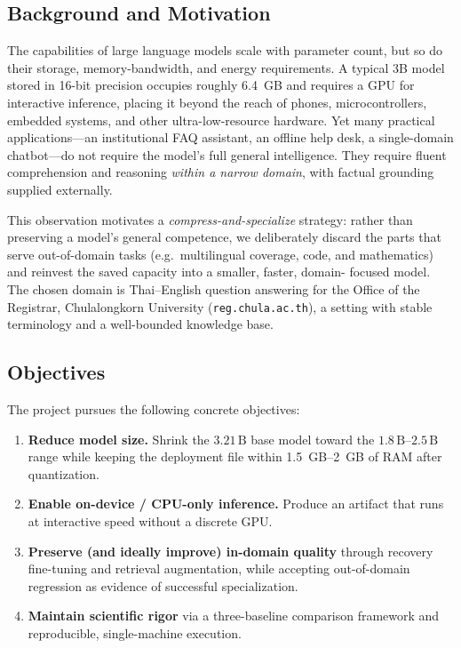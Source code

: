 \documentclass[11pt,a4paper]{article}
\newcommand{\param}[1]{\ensuremath{#1\,\text{B}}}
\begin{document}
\subsection{Background and Motivation}
The capabilities of large language models scale with parameter count, but so
do their storage, memory-bandwidth, and energy requirements. A typical 3B
model stored in 16-bit precision occupies roughly \SI{6.4}{GB} and requires a
GPU for interactive inference, placing it beyond the reach of phones,
microcontrollers, embedded systems, and other ultra-low-resource hardware.
Yet many practical applications---an institutional FAQ assistant, an offline
help desk, a single-domain chatbot---do not require the model's full general
intelligence. They require fluent comprehension and reasoning \emph{within a
narrow domain}, with factual grounding supplied externally.

This observation motivates a \emph{compress-and-specialize} strategy: rather
than preserving a model's general competence, we deliberately discard the
parts that serve out-of-domain tasks (e.g.\ multilingual coverage, code, and
mathematics) and reinvest the saved capacity into a smaller, faster, domain-%
focused model. The chosen domain is Thai--English question answering for the
Office of the Registrar, Chulalongkorn University (\texttt{reg.chula.ac.th}),
a setting with stable terminology and a well-bounded knowledge base.

\subsection{Objectives}
The project pursues the following concrete objectives:
\begin{enumerate}[label=(O\arabic*),leftmargin=2.4em]
  \item \textbf{Reduce model size.} Shrink the \param{3.21} base model toward
        the \param{1.8}--\param{2.5} range while keeping the deployment file
        within \SIrange{1.5}{2}{GB} of RAM after quantization.
  \item \textbf{Enable on-device / CPU-only inference.} Produce an artifact
        that runs at interactive speed without a discrete GPU.
  \item \textbf{Preserve (and ideally improve) in-domain quality} through
        recovery fine-tuning and retrieval augmentation, while accepting
        out-of-domain regression as evidence of successful specialization.
  \item \textbf{Maintain scientific rigor} via a three-baseline comparison
        framework and reproducible, single-machine execution.
\end{enumerate}
\end{document}
